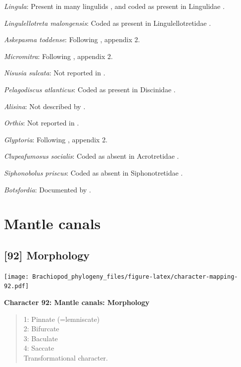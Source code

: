 \documentclass[openany]{book}
\theoremstyle{definition}
\theoremstyle{definition}
\theoremstyle{definition}
\theoremstyle{remark}
\begin{document}
\emph{Lingula}: Present in many lingulids
\citep{Williams2000BrachiopodaLinguliformea}, and coded as present in
Lingulidae \citep[table 6]{Williams2000BrachiopodaLinguliformea}.

\emph{Lingulellotreta malongensis}: Coded as present in
Lingulellotretidae \citep[table
6]{Williams2000BrachiopodaLinguliformea}.

\emph{Askepasma toddense}: Following \citet{Williams1998Thediversity},
appendix 2.

\emph{Micromitra}: Following \citet{Williams1998Thediversity}, appendix
2.

\emph{Nisusia sulcata}: Not reported in
\citet{Williams2000BrachiopodaLinguliformea}.

\emph{Pelagodiscus atlanticus}: Coded as present in Discinidae
\citep[table 6]{Williams2000BrachiopodaLinguliformea}.

\emph{Alisina}: Not described by
\citet{Williams2000BrachiopodaLinguliformea}.

\emph{Orthis}: Not reported in
\citet{Williams2000BrachiopodaLinguliformea}.

\emph{Glyptoria}: Following \citet{Williams1998Thediversity}, appendix
2.

\emph{Clupeafumosus socialis}: Coded as absent in Acrotretidae
\citep[table 6]{Williams2000BrachiopodaLinguliformea}.

\emph{Siphonobolus priscus}: Coded as absent in Siphonotretidae
\citep[table 6]{Williams2000BrachiopodaLinguliformea}.

\emph{Botsfordia}: Documented by \citet{Skovsted2017Depthrelated}.

\hypertarget{mantle-canals}{%
\section{Mantle canals}\label{mantle-canals}}

\hypertarget{morphology-1}{%
\subsection*{{[}92{]} Morphology}\label{morphology-1}}

\texttt{[image: Brachiopod\_phylogeny\_files/figure-latex/character-mapping-92.pdf]}

\textbf{Character 92: Mantle canals: Morphology}

\begin{quote}
1: Pinnate (=lemniscate)\\
2: Bifurcate\\
3: Baculate\\
4: Saccate\\
Transformational character.
\end{quote}
\end{document}
